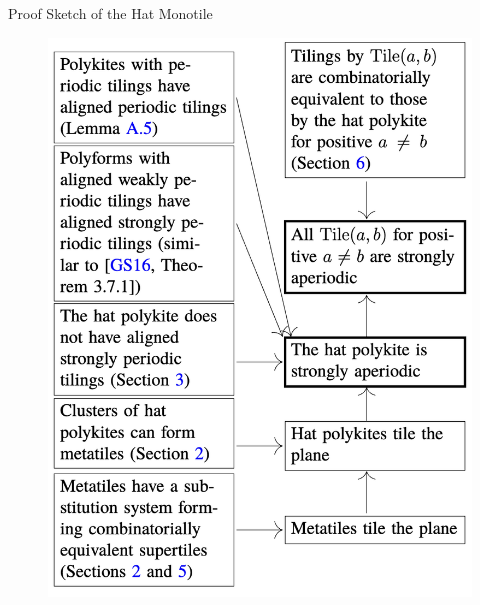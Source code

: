 \documentclass{beamer}
\begin{document}
\begin{frame}{Proof Sketch of the Hat Monotile}
    \begin{figure}
        \centering
        \begin{minipage}{0.4\textwidth}
            \includegraphics[width=\linewidth]{images/proof1.png}
        \end{minipage}\hfill
        \begin{minipage}{0.45\textwidth}

\end{minipage}
\end{figure}
\end{frame}
\end{document}
